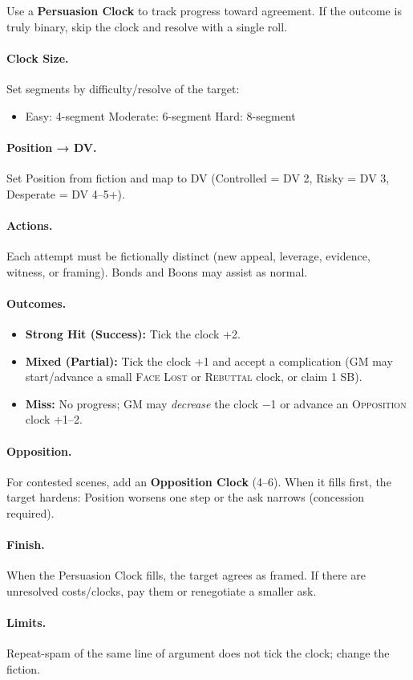 Use a \textbf{Persuasion Clock} to track progress toward agreement. If the outcome is truly binary, skip the clock and resolve with a single roll.

\paragraph{Clock Size.}
Set segments by difficulty/resolve of the target:
\begin{itemize}
  \item Easy: 4-segment \quad Moderate: 6-segment \quad Hard: 8-segment
\end{itemize}

\paragraph{Position → DV.}
Set Position from fiction and map to DV (Controlled = DV 2, Risky = DV 3, Desperate = DV 4–5+).

\paragraph{Actions.}
Each attempt must be fictionally distinct (new appeal, leverage, evidence, witness, or framing). Bonds and Boons may assist as normal.

\paragraph{Outcomes.}
\begin{itemize}
  \item \textbf{Strong Hit (Success):} Tick the clock +2.
  \item \textbf{Mixed (Partial):} Tick the clock +1 and accept a complication (GM may start/advance a small \textsc{Face Lost} or \textsc{Rebuttal} clock, or claim 1 SB).
  \item \textbf{Miss:} No progress; GM may \emph{decrease} the clock −1 or advance an \textsc{Opposition} clock +1–2.
\end{itemize}

\paragraph{Opposition.}
For contested scenes, add an \textbf{Opposition Clock} (4–6). When it fills first, the target hardens: Position worsens one step or the ask narrows (concession required).

\paragraph{Finish.}
When the Persuasion Clock fills, the target agrees as framed. If there are unresolved costs/clocks, pay them or renegotiate a smaller ask.

\paragraph{Limits.}
Repeat-spam of the same line of argument does not tick the clock; change the fiction.
